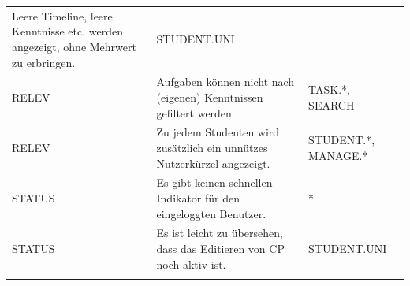 \documentclass[
  12pt,
  ngerman,
  a4paper,
]{article}
\begin{document}
\begin{longtable}[]{@{}lll@{}}
\begin{minipage}[t]{0.52\columnwidth}
Leere Timeline, leere Kenntnisse etc. werden angezeigt, ohne Mehrwert zu
erbringen.\strut
\end{minipage} & \begin{minipage}[t]{0.17\columnwidth}\raggedright
STUDENT.UNI\strut
\end{minipage}\tabularnewline
\begin{minipage}[t]{0.22\columnwidth}\raggedright
RELEV\strut
\end{minipage} & \begin{minipage}[t]{0.52\columnwidth}\raggedright
Aufgaben können nicht nach (eigenen) Kenntnissen gefiltert werden\strut
\end{minipage} & \begin{minipage}[t]{0.17\columnwidth}\raggedright
TASK.*, SEARCH\strut
\end{minipage}\tabularnewline
\begin{minipage}[t]{0.22\columnwidth}\raggedright
RELEV\strut
\end{minipage} & \begin{minipage}[t]{0.52\columnwidth}\raggedright
Zu jedem Studenten wird zusätzlich ein unnützes Nutzerkürzel
angezeigt.\strut
\end{minipage} & \begin{minipage}[t]{0.17\columnwidth}\raggedright
STUDENT.*, MANAGE.*\strut
\end{minipage}\tabularnewline
\begin{minipage}[t]{0.22\columnwidth}\raggedright
STATUS\strut
\end{minipage} & \begin{minipage}[t]{0.52\columnwidth}\raggedright
Es gibt keinen schnellen Indikator für den eingeloggten Benutzer.\strut
\end{minipage} & \begin{minipage}[t]{0.17\columnwidth}\raggedright
*\strut
\end{minipage}\tabularnewline
\begin{minipage}[t]{0.22\columnwidth}\raggedright
STATUS\strut
\end{minipage} & \begin{minipage}[t]{0.52\columnwidth}\raggedright
Es ist leicht zu übersehen, dass das Editieren von CP noch aktiv
ist.\strut
\end{minipage} & \begin{minipage}[t]{0.17\columnwidth}\raggedright
STUDENT.UNI\strut
\end{minipage}\tabularnewline
\begin{minipage}[t]{0.22\columnwidth}\raggedright

\end{minipage}
\end{longtable}
\end{document}

